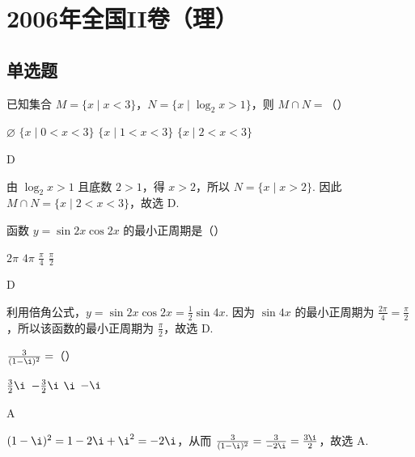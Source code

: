 \chapter{2006年全国II卷（理）}
\section{单选题}
\begin{problem}
已知集合 \(M = \{x \mid x < 3\}\)，\(N = \{x \mid \log_2 x > 1\}\)，则 \(M \cap N =\)（\quad）

\choices
    {\(\varnothing\)}
    {\(\{x \mid 0 < x < 3\}\)}
    {\(\{x \mid 1 < x < 3\}\)}
    {\(\{x \mid 2 < x < 3\}\)}
\end{problem}

\begin{answer}
D
\end{answer}

\begin{solution}
由 \(\log_2x>1\) 且底数 \(2>1\)，得 \(x>2\)，所以 \(N=\{x\mid x>2\}\). 因此
\(M\cap N=\{x\mid 2<x<3\}\)，故选 D.
\end{solution}

\begin{problem}
函数 \(y = \sin 2x \cos 2x\) 的最小正周期是（\quad）

\choices
    {\(2\pi\)}
    {\(4\pi\)}
    {\(\frac{\pi}{4}\)}
    {\(\frac{\pi}{2}\)}
\end{problem}

\begin{answer}
D
\end{answer}

\begin{solution}
利用倍角公式，\(y=\sin2x\cos2x=\frac12\sin4x\). 因为 \(\sin4x\) 的最小正周期为 \(\frac{2\pi}{4}=\frac\pi2\)，所以该函数的最小正周期为 \(\frac\pi2\)，故选 D.
\end{solution}

\begin{problem}
\(\frac{3}{(1 - \i)^2} =\)（\quad）

\choices
    {\(\frac{3}{2}\i\)}
    {\(-\frac{3}{2}\i\)}
    {\(\i\)}
    {\(-\i\)}
\end{problem}

\begin{answer}
A
\end{answer}

\begin{solution}
\((1-\i)^2=1-2\i+\i^2=-2\i\)，从而
\(\frac{3}{(1-\i)^2}=\frac{3}{-2\i}=\frac{3\i}{2}\)，故选 A.
\end{solution}


